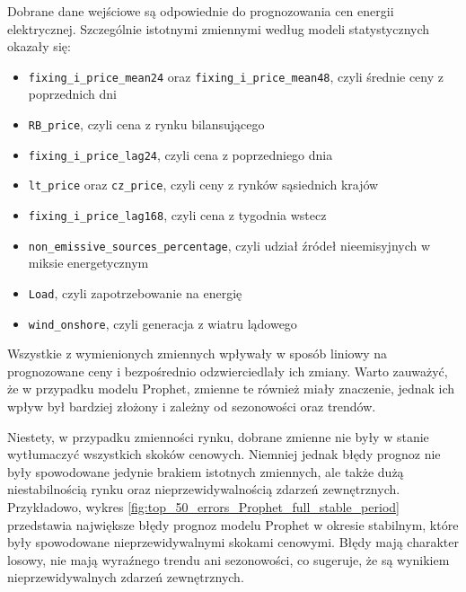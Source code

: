 Dobrane dane wejściowe są odpowiednie do prognozowania cen energii elektrycznej. Szczególnie istotnymi zmiennymi według modeli statystycznych okazały się:
\begin{itemize}
    \item \texttt{fixing\_i\_price\_mean24} oraz \texttt{fixing\_i\_price\_mean48}, czyli średnie ceny z poprzednich dni
    \item \texttt{RB\_price}, czyli cena z rynku bilansującego
    \item \texttt{fixing\_i\_price\_lag24}, czyli cena z poprzedniego dnia
    \item \texttt{lt\_price} oraz \texttt{cz\_price}, czyli ceny z rynków sąsiednich krajów
    \item \texttt{fixing\_i\_price\_lag168}, czyli cena z tygodnia wstecz
    \item \texttt{non\_emissive\_sources\_percentage}, czyli udział źródeł nieemisyjnych w miksie energetycznym
    \item \texttt{Load}, czyli zapotrzebowanie na energię
    \item \texttt{wind\_onshore}, czyli generacja z wiatru lądowego
\end{itemize}
Wszystkie z wymienionych zmiennych wpływały w sposób liniowy na prognozowane ceny i bezpośrednio odzwierciedlały ich zmiany. Warto zauważyć, że w przypadku modelu Prophet, zmienne te również miały znaczenie, jednak ich wpływ był bardziej złożony i zależny od sezonowości oraz trendów.

Niestety, w przypadku zmienności rynku, dobrane zmienne nie były w stanie wytłumaczyć wszystkich skoków cenowych. Niemniej jednak błędy prognoz nie były spowodowane jedynie brakiem istotnych zmiennych, ale także dużą niestabilnością rynku oraz nieprzewidywalnością zdarzeń zewnętrznych. Przykładowo, wykres \ref{fig:top_50_errors_Prophet_full_stable_period} przedstawia największe błędy prognoz modelu Prophet w okresie stabilnym, które były spowodowane nieprzewidywalnymi skokami cenowymi. Błędy mają charakter losowy, nie mają wyraźnego trendu ani sezonowości, co sugeruje, że są wynikiem nieprzewidywalnych zdarzeń zewnętrznych.

